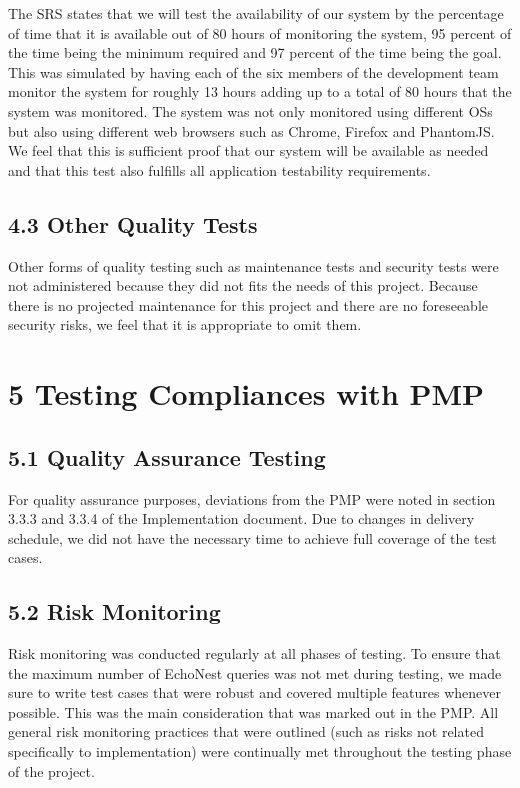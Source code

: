 \documentclass[]{article}
\begin{document}
The SRS states that we will test the availability of our system by the
percentage of time that it is available out of 80 hours of monitoring
the system, 95 percent of the time being the minimum required and 97
percent of the time being the goal. This was simulated by having each of
the six members of the development team monitor the system for roughly
13 hours adding up to a total of 80 hours that the system was monitored.
The system was not only monitored using different OSs but also using
different web browsers such as Chrome, Firefox and PhantomJS. We feel
that this is sufficient proof that our system will be available as
needed and that this test also fulfills all application testability
requirements.

\subsection{4.3 Other Quality Tests}\label{other-quality-tests}

Other forms of quality testing such as maintenance tests and security
tests were not administered because they did not fits the needs of this
project. Because there is no projected maintenance for this project and
there are no foreseeable security risks, we feel that it is appropriate
to omit them.

\section{5 Testing Compliances with
PMP}\label{testing-compliances-with-pmp}

\subsection{5.1 Quality Assurance
Testing}\label{quality-assurance-testing}

For quality assurance purposes, deviations from the PMP were noted in
section 3.3.3 and 3.3.4 of the Implementation document. Due to changes
in delivery schedule, we did not have the necessary time to achieve full
coverage of the test cases.

\subsection{5.2 Risk Monitoring}\label{risk-monitoring}

Risk monitoring was conducted regularly at all phases of testing. To
ensure that the maximum number of EchoNest queries was not met during
testing, we made sure to write test cases that were robust and covered
multiple features whenever possible. This was the main consideration
that was marked out in the PMP. All general risk monitoring practices
that were outlined (such as risks not related specifically to
implementation) were continually met throughout the testing phase of the
project.
\end{document}
